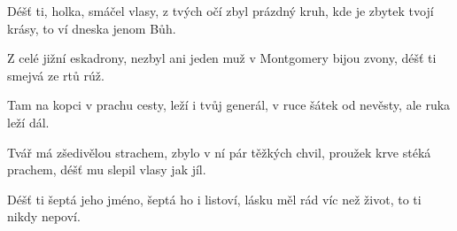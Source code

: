 
\beginverse{}
Déšť ti, holka, smáčel vlasy, 
z tvých očí zbyl prázdný kruh, 
kde je zbytek tvojí krásy, 
to ví dneska jenom Bůh. 
\endverse{}

\beginchorus{}
Z celé jižní eskadrony, 
nezbyl ani jeden muž 
v Montgomery bijou zvony,
déšť ti smejvá ze rtů rúž. 
\endchorus{}

\beginverse{}
Tam na kopci v prachu cesty, 
leží i tvůj generál, 
v ruce šátek od nevěsty, 
ale ruka leží dál. 
\endverse{}

\beginchorus{}
\phantom{}
\endchorus{}

\beginverse{}
Tvář má zšedivělou strachem, 
zbylo v ní pár těžkých chvil, 
proužek krve stéká prachem, 
déšť mu slepil vlasy jak jíl. 
\endverse{}

\beginchorus{}
\phantom{}
\endchorus{}

\beginverse{}
Déšť ti šeptá jeho jméno,
šeptá ho i listoví, 
lásku měl rád víc než život, 
to ti nikdy nepoví. 
\endverse{}

\beginchorus{}
\phantom{}
\endchorus{}

\endsong{}
